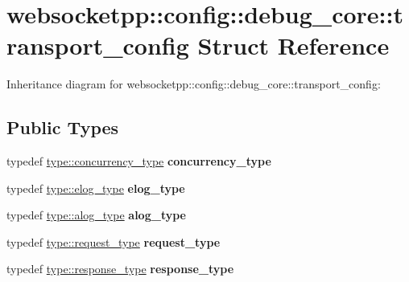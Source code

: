 \hypertarget{structwebsocketpp_1_1config_1_1debug__core_1_1transport__config}{}\section{websocketpp\+:\+:config\+:\+:debug\+\_\+core\+:\+:transport\+\_\+config Struct Reference}
\label{structwebsocketpp_1_1config_1_1debug__core_1_1transport__config}


Inheritance diagram for websocketpp\+:\+:config\+:\+:debug\+\_\+core\+:\+:transport\+\_\+config\+:
\subsection*{Public Types}
\begin{DoxyCompactItemize}
\item 
\mbox{\label{structwebsocketpp_1_1config_1_1debug__core_1_1transport__config_a3dcd0e3cfc508d9a7e1c096735915f36}} 
typedef \mbox{\hyperlink{classwebsocketpp_1_1concurrency_1_1basic}{type\+::concurrency\+\_\+type}} {\bfseries concurrency\+\_\+type}
\item 
\mbox{\label{structwebsocketpp_1_1config_1_1debug__core_1_1transport__config_a408656d4012b1b02d296bb9a7da84c49}} 
typedef \mbox{\hyperlink{structwebsocketpp_1_1config_1_1debug__core_acfa1ded7f80d6a7276b0ec3fd0859fc3}{type\+::elog\+\_\+type}} {\bfseries elog\+\_\+type}
\item 
\mbox{\label{structwebsocketpp_1_1config_1_1debug__core_1_1transport__config_a400180c9d501bcdac92a42eee2e233e6}} 
typedef \mbox{\hyperlink{classwebsocketpp_1_1log_1_1basic}{type\+::alog\+\_\+type}} {\bfseries alog\+\_\+type}
\item 
\mbox{\label{structwebsocketpp_1_1config_1_1debug__core_1_1transport__config_a39a4450305cfaa5c8211d3dff2a7c871}} 
typedef \mbox{\hyperlink{classwebsocketpp_1_1http_1_1parser_1_1request}{type\+::request\+\_\+type}} {\bfseries request\+\_\+type}
\item 
\mbox{\label{structwebsocketpp_1_1config_1_1debug__core_1_1transport__config_af3f1a34b5663166430b52e4dd1f1398a}} 
typedef \mbox{\hyperlink{classwebsocketpp_1_1http_1_1parser_1_1response}{type\+::response\+\_\+type}} {\bfseries response\+\_\+type}
\end{DoxyCompactItemize}
